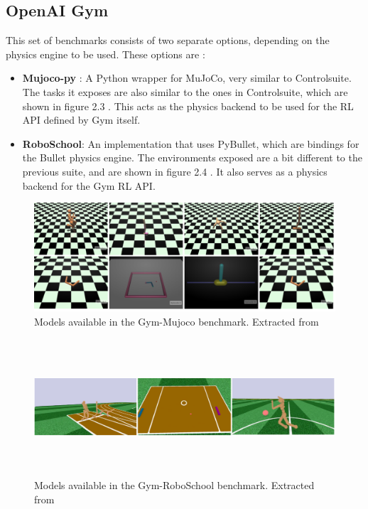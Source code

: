     \subsection{OpenAI Gym}
    This set of benchmarks consists of two separate options, depending on the physics engine to be used. These options are :

    \begin{itemize}
        \item \textbf{Mujoco-py} : A Python wrapper for MuJoCo, very similar to Controlsuite. The tasks it
            exposes are also similar to the ones in Controlsuite, which are shown in figure 2.3 . This acts as
            the physics backend to be used for the RL API defined by Gym itself.
        \item \textbf{RoboSchool}: An implementation that uses PyBullet, which are bindings for the Bullet physics
            engine. The environments exposed are a bit different to the previous suite, and are shown in figure 2.4 . It
            also serves as a physics backend for the Gym RL API.
    \end{itemize}

    \begin{figure}[!ht]
        \centering
        \includegraphics[width=5.5in]{./chapters/imgs/img_openai_gym_mujoco_envs.png}
        \caption[Gym Mujoco models]{Models available in the Gym-Mujoco benchmark. Extracted from \citet{Gym}}
        \label{fig:gym-mujoco-envs}
    \end{figure}

    \begin{figure}[!ht]
        \centering
        \includegraphics[width=6.0in,height=2.0in]{./chapters/imgs/img_openai_gym_roboschool_envs.png}
        \caption[Gym RoboSchool models]{Models available in the Gym-RoboSchool benchmark. Extracted from \citet{Gym}}
        \label{fig:gym-roboschool-envs}
    \end{figure}


